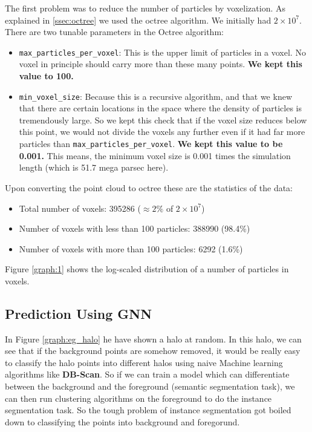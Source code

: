     The first problem was to reduce the number of particles by voxelization. As explained in \ref{ssec:octree} we used the octree algorithm. We initially had $2\times10^7$. There are two tunable parameters in the Octree algorithm: 

    \begin{itemize}
        \item \texttt{max\_particles\_per\_voxel}: This is the upper limit of particles in a voxel. No voxel in principle should carry more than these many points. \textbf{We kept this value to 100.}
        \item \texttt{min\_voxel\_size}: Because this is a recursive algorithm, and that we knew that there are certain locations in the space where the density of particles is tremendously large. So we kept this check that if the voxel size reduces below this point, we would not divide the voxels any further even if it had far more particles than \texttt{max\_particles\_per\_voxel}. \textbf{We kept this value to be 0.001.} This means, the minimum voxel size is 0.001 times the simulation length (which is 51.7 mega parsec here).
    \end{itemize}

    Upon converting the point cloud to octree these are the statistics of the data:

    \begin{itemize}
        \item Total number of voxels: 395286 ($\approx2\%$ of $2\times10^7$)
        \item Number of voxels with less than 100 particles: 388990 (98.4\%)
        \item Number of voxels with more than 100 particles: 6292 (1.6\%)
    \end{itemize}

    Figure \ref{graph:1} shows the log-scaled distribution of a number of particles in voxels.

\subsection{Prediction Using GNN}

    In Figure \ref{graph:eg_halo} he have shown a halo at random. In this halo, we can see that if the background points are somehow removed, it would be really easy to classify the halo points into different halos using naive Machine learning algorithms like \textbf{DB-Scan}. So if we can train a model which can differentiate between the background and the foreground (semantic segmentation task), we can then run clustering algorithms on the foreground to do the instance segmentation task. So the tough problem of instance segmentation got boiled down to classifying the points into background and foregorund.

